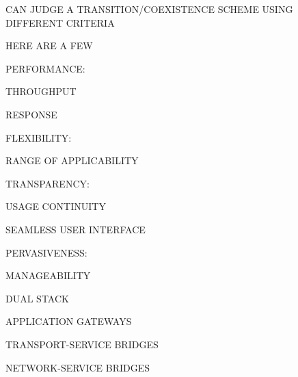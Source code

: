 \begin{bwslide}

\begin{nrtc}
\item	CAN JUDGE A TRANSITION/COEXISTENCE SCHEME USING DIFFERENT
	CRITERIA

\item	HERE ARE A FEW
    \begin{nrtc}
    \item	PERFORMANCE:
	\begin{nrtc}
	\item	THROUGHPUT

	\item	RESPONSE
	\end{nrtc}

    \item	FLEXIBILITY:
	\begin{nrtc}
	\item	RANGE OF APPLICABILITY
	\end{nrtc}

    \item	TRANSPARENCY:
	\begin{nrtc}
	\item	USAGE CONTINUITY

	\item	SEAMLESS USER INTERFACE
	\end{nrtc}

    \item	PERVASIVENESS:
	\begin{nrtc}
	\item	MANAGEABILITY
	\end{nrtc}
    \end{nrtc}
\end{nrtc}
\end{bwslide}


\begin{bwslide}

\begin{nrtc}
\item	DUAL STACK

\item	APPLICATION GATEWAYS

\item	TRANSPORT-SERVICE BRIDGES

\item	NETWORK-SERVICE BRIDGES
\end{nrtc}
\end{bwslide}


